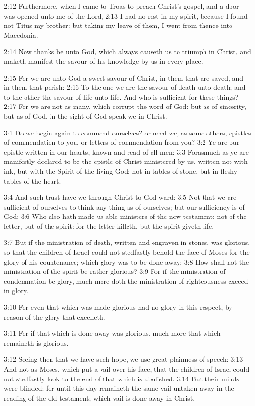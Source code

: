 2:12 Furthermore, when I came to Troas to preach Christ's gospel, and
a door was opened unto me of the Lord, 2:13 I had no rest in my
spirit, because I found not Titus my brother: but taking my leave of
them, I went from thence into Macedonia.

2:14 Now thanks be unto God, which always causeth us to triumph in
Christ, and maketh manifest the savour of his knowledge by us in every
place.

2:15 For we are unto God a sweet savour of Christ, in them that are
saved, and in them that perish: 2:16 To the one we are the savour of
death unto death; and to the other the savour of life unto life. And
who is sufficient for these things?  2:17 For we are not as many,
which corrupt the word of God: but as of sincerity, but as of God, in
the sight of God speak we in Christ.

3:1 Do we begin again to commend ourselves? or need we, as some
others, epistles of commendation to you, or letters of commendation
from you?  3:2 Ye are our epistle written in our hearts, known and
read of all men: 3:3 Forasmuch as ye are manifestly declared to be the
epistle of Christ ministered by us, written not with ink, but with the
Spirit of the living God; not in tables of stone, but in fleshy tables
of the heart.

3:4 And such trust have we through Christ to God-ward: 3:5 Not that we
are sufficient of ourselves to think any thing as of ourselves; but
our sufficiency is of God; 3:6 Who also hath made us able ministers of
the new testament; not of the letter, but of the spirit: for the
letter killeth, but the spirit giveth life.

3:7 But if the ministration of death, written and engraven in stones,
was glorious, so that the children of Israel could not stedfastly
behold the face of Moses for the glory of his countenance; which glory
was to be done away: 3:8 How shall not the ministration of the spirit
be rather glorious?  3:9 For if the ministration of condemnation be
glory, much more doth the ministration of righteousness exceed in
glory.

3:10 For even that which was made glorious had no glory in this
respect, by reason of the glory that excelleth.

3:11 For if that which is done away was glorious, much more that which
remaineth is glorious.

3:12 Seeing then that we have such hope, we use great plainness of
speech: 3:13 And not as Moses, which put a vail over his face, that
the children of Israel could not stedfastly look to the end of that
which is abolished: 3:14 But their minds were blinded: for until this
day remaineth the same vail untaken away in the reading of the old
testament; which vail is done away in Christ.

